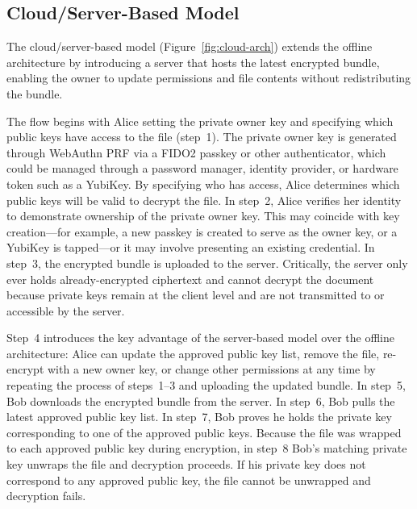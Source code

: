 \subsection{Cloud/Server-Based Model}
\label{sec:cloud-model}

The cloud/server-based model (Figure~\ref{fig:cloud-arch}) extends the offline architecture by introducing a server that hosts the latest encrypted bundle, enabling the owner to update permissions and file contents without redistributing the bundle.


The flow begins with Alice setting the private owner key and specifying which public keys have access to the file (step~1). The private owner key is generated through WebAuthn PRF via a FIDO2 passkey or other authenticator, which could be managed through a password manager, identity provider, or hardware token such as a YubiKey. By specifying who has access, Alice determines which public keys will be valid to decrypt the file. In step~2, Alice verifies her identity to demonstrate ownership of the private owner key. This may coincide with key creation---for example, a new passkey is created to serve as the owner key, or a YubiKey is tapped---or it may involve presenting an existing credential. In step~3, the encrypted bundle is uploaded to the server. Critically, the server only ever holds already-encrypted ciphertext and cannot decrypt the document because private keys remain at the client level and are not transmitted to or accessible by the server.

Step~4 introduces the key advantage of the server-based model over the offline architecture: Alice can update the approved public key list, remove the file, re-encrypt with a new owner key, or change other permissions at any time by repeating the process of steps~1--3 and uploading the updated bundle. In step~5, Bob downloads the encrypted bundle from the server. In step~6, Bob pulls the latest approved public key list. In step~7, Bob proves he holds the private key corresponding to one of the approved public keys. Because the file was wrapped to each approved public key during encryption, in step~8 Bob's matching private key unwraps the file and decryption proceeds. If his private key does not correspond to any approved public key, the file cannot be unwrapped and decryption fails.

